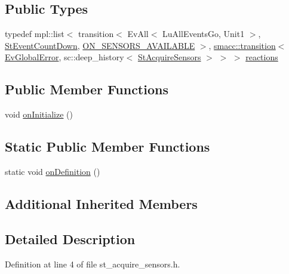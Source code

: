 \subsection*{Public Types}
\begin{DoxyCompactItemize}
\item 
typedef mpl\+::list$<$ transition$<$ Ev\+All$<$ Lu\+All\+Events\+Go, Unit1 $>$, \hyperlink{structsm__dance__bot_1_1StEventCountDown}{St\+Event\+Count\+Down}, \hyperlink{structsm__dance__bot_1_1StAcquireSensors_1_1ON__SENSORS__AVAILABLE}{O\+N\+\_\+\+S\+E\+N\+S\+O\+R\+S\+\_\+\+A\+V\+A\+I\+L\+A\+B\+LE} $>$, \hyperlink{classsmacc_1_1transition}{smacc\+::transition}$<$ \hyperlink{structsm__dance__bot_1_1EvGlobalError}{Ev\+Global\+Error}, sc\+::deep\+\_\+history$<$ \hyperlink{structsm__dance__bot_1_1StAcquireSensors}{St\+Acquire\+Sensors} $>$ $>$ $>$ \hyperlink{structsm__dance__bot_1_1StAcquireSensors_aee65ad66e119102e3ef5e2e959c0e08b}{reactions}
\end{DoxyCompactItemize}
\subsection*{Public Member Functions}
\begin{DoxyCompactItemize}
\item 
void \hyperlink{structsm__dance__bot_1_1StAcquireSensors_a520b68731dc5d92ff1c9aa1f1963cfe5}{on\+Initialize} ()
\end{DoxyCompactItemize}
\subsection*{Static Public Member Functions}
\begin{DoxyCompactItemize}
\item 
static void \hyperlink{structsm__dance__bot_1_1StAcquireSensors_ae30f4b633faa922070fc8412b6dd78fc}{on\+Definition} ()
\end{DoxyCompactItemize}
\subsection*{Additional Inherited Members}


\subsection{Detailed Description}


Definition at line 4 of file st\+\_\+acquire\+\_\+sensors.\+h.



